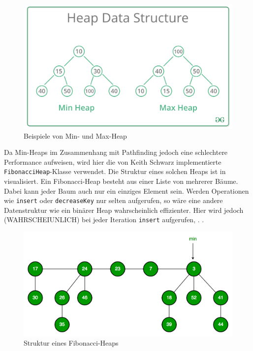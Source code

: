                 \begin{figure}
                    \centering
                    \includegraphics[width=0.75\linewidth]{images/min-max-heap.png}
                    \caption{Beispiele von Min- und Max-Heap\\\cite{EZ:Web60}}
                    \label{fig:min-max-heap}
                \end{figure}
                
                Da Min-Heaps im Zusammenhang mit Pathfinding jedoch eine schlechtere Performance aufweisen, wird hier die von Keith Schwarz implementierte \lstinline{FibonacciHeap}-Klasse verwendet. Die Struktur eines solchen Heaps ist in  visualisiert. Ein Fibonacci-Heap besteht aus einer Liste von mehrerer Bäume. Dabei kann jeder Baum auch nur ein einziges Element sein. Werden Operationen wie \lstinline{insert} oder \lstinline{decreaseKey} nur selten aufgerufen, so wäre eine andere Datenstruktur wie \zb ein binärer Heap wahrscheinlich effizienter. Hier wird jedoch (WAHRSCHEIUNLICH) bei jeder Iteration \lstinline{insert} aufgerufen, . \cite{EZ:Web53, EZ:Web56}.  %
                
                \begin{figure}
                    \centering
                    \includegraphics[width=0.75\linewidth]{images/fibonacci-heap.png}
                    \caption{Struktur eines Fibonacci-Heaps\\\cite{EZ:Web54}}
                    \label{fig:fibonacci-heap}
                \end{figure}

